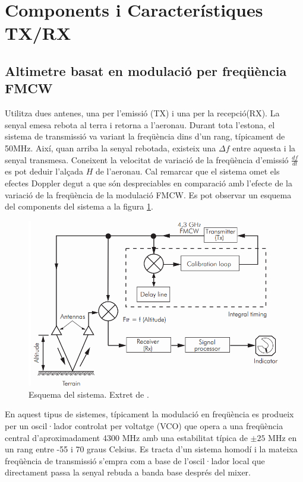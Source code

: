 \section{Components i Característiques TX/RX}
\subsection{Altimetre basat en modulació per freqüència FMCW}
Utilitza dues antenes, una per l'emissió (TX) i una per la recepció(RX). La senyal emesa rebota al terra i retorna a l'aeronau. Durant tota l'estona, el sistema de transmissió va variant la freqüència dins d'un rang, típicament de 50MHz. Així, quan arriba la senyal rebotada, existeix una $\Delta f$ entre aquesta i la senyal transmesa. Coneixent la velocitat de variació de la freqüència d'emissió $\frac{df}{dt}$ es pot deduir l'alçada $H$ de l'aeronau. Cal remarcar que el sistema omet els efectes Doppler degut a que són despreciables en comparació amb l'efecte de la variació de la freqüència de la modulació FMCW.
Es pot observar un esquema del components del sistema a la figura \ref{fmcw}.
\begin{figure}[H]
	\centering
	\includegraphics[scale=0.5]{./img/FMCW.png}
	\caption{Esquema del sistema. Extret de \cite{NationalTelecommunicationsandInformationAdministration2014}.}
	\label{fmcw}
\end{figure}

En aquest tipus de sistemes, típicament la modulació en freqüència es produeix per un oscil·lador controlat per voltatge (VCO) que opera a una freqüència central d'aproximadament 4300 MHz amb una estabilitat típica de $\pm 25$ MHz en un rang entre -55 i 70 graus Celsius.
Es tracta d'un sistema homodí i la mateixa freqüència de transmissió s'empra com a base de l'oscil·lador local que directament passa la senyal rebuda a banda base després del mixer.

